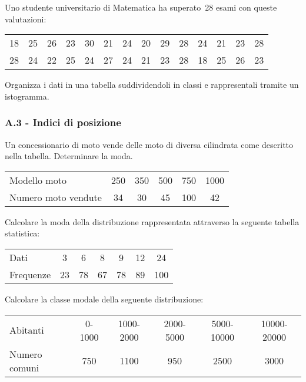 \begin{esercizio}
\label{ese:A.20}
Uno studente universitario di Matematica ha superato~28 esami con queste valutazioni:
\begin{center}
 \begin{tabular}{cccccccccccccc}
18 & 25 & 26 & 23 & 30 & 21 & 24 & 20 & 29 & 28 & 24 & 21 & 23 & 28\\
28 & 24 & 22 & 25 & 24 & 27 & 24 & 21 & 23 & 28 & 18 & 25 & 26 & 23\\
 \end{tabular}
\end{center}
Organizza i dati in una tabella suddividendoli in classi e rappresentali tramite un istogramma.
\end{esercizio}

\subsubsection*{A.3 - Indici di posizione}

\begin{esercizio}
\label{ese:A.21}
Un concessionario di moto vende delle moto di diversa cilindrata come descritto nella tabella.
Determinare la moda.
\begin{center}
\begin{tabular}{l*{5}{c}}
\toprule
Modello moto & 250 &350 &500 &750 &1000\\
Numero moto vendute & 34 & 30 & 45 & 100 & 42 \\
\bottomrule
\end{tabular}
\end{center}
\end{esercizio}

\begin{esercizio}
\label{ese:A.22}
Calcolare la moda della distribuzione rappresentata attraverso la seguente tabella statistica:
\begin{center}
 \begin{tabular}{l*{6}{c}}
\toprule
Dati & 3 & 6 & 8 & 9 & 12 & 24 \\
Frequenze & 23 & 78 & 67 & 78 & 89 & 100 \\
\bottomrule
\end{tabular}
\end{center}
\end{esercizio}

\begin{esercizio}
\label{ese:A.23}
Calcolare la classe modale della seguente distribuzione:
\begin{center}
\begin{tabular}{l*{5}{c}}
\toprule
Abitanti & 0-1000& 1000-2000& 2000-5000 & 5000-10000& 10000-20000 \\
Numero comuni & 750 & 1100 & 950 & 2500 & 3000 \\
\bottomrule
\end{tabular}
\end{center}
\end{esercizio}

